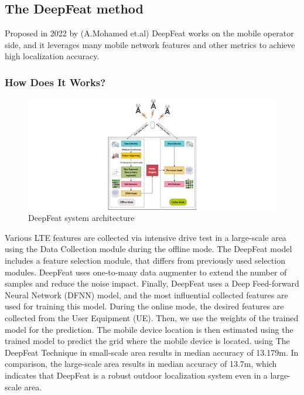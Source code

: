 \subsection{The DeepFeat method}
Proposed in 2022 by (A.Mohamed et.al)\cite{amel} DeepFeat works on the mobile operator side,
and it leverages many mobile network features and other metrics to achieve high localization accuracy.
\subsubsection{How Does It Works?}
\begin{figure}
    \centering
    \includegraphics[scale = 2]{images/access-gagraphic-3140292.jpg}
    \caption{DeepFeat system architecture}
    \label{fig:dpft_sys_arch}
\end{figure}
Various LTE features are collected via intensive drive test in a large-scale area using the Data Collection module during the offline mode.
The DeepFeat model includes a feature selection module, that differs from previously used selection modules.
DeepFeat uses one-to-many data augmenter to extend the number of samples and reduce the noise impact.
Finally, DeepFeat uses a Deep Feed-forward Neural Network (DFNN) model, and the most influential collected features are used for training this model.
During the online mode, the desired features are collected from the User Equipment (UE).
Then, we use the weights of the trained model for the prediction.
The mobile device location is then estimated using the trained model to predict the grid where the mobile device is located.
using The DeepFeat Technique in  small-scale area results in median accuracy of 13.179m.
In comparison, the large-scale area results in median accuracy of 13.7m, which indicates that DeepFeat is a robust outdoor localization system even in a large-scale area.